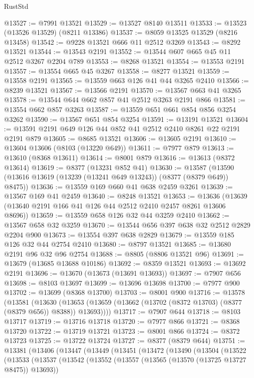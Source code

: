 \begin{lexlean}{RustStd}
\begin{coremodule}
@13527 := @7991 @13521
@13529 := @13527 @8140 @13511
@13533 := @13523 (@13526 @13529) (@8211 @13386)
@13537 := @8059 @13525 @13529 (@8216 @13458)
@13542 := @9228 @13521 @666 @11 @2512 @3269
@13543 := @8292 @13521
@13544 := @13543 @2191
@13552 := @13544 @607 @665 @45 @11 @2512 @3267 @2204 @789
@13553 := @8268 @13521
@13554 := @13553 @2191
@13557 := @13554 @665 @45 @3267
@13558 := @8277 @13521
@13559 := @13558 @2191
@13565 := @13559 @663 @126 @41 @44 @3265 @2410
@13566 := @8239 @13521
@13567 := @13566 @2191
@13570 := @13567 @663 @41 @3265
@13578 := @13544 @644 @662 @857 @41 @2512 @3263 @2191 @866
@13581 := @13554 @662 @857 @3263
@13587 := @13559 @651 @661 @854 @856 @3254 @3262
@13590 := @13567 @651 @854 @3254
@13591 := @13191 @13521
@13604 := @13591 @2191 @649 @126 @44 @852 @41 @2512 @2410 @8261 @22 @2191 @2191 @879
@13605 := @8685 @13521
@13606 := @13605 @2191
@13610 := @13604 @13606 (@8103 (@13220 @649))
@13611 := @7977 @879
@13613 := @13610 (@8368 @13611)
@13614 := @8001 @879
@13616 := @13613 (@8372 @13614)
@13619 := @8377 (@13231 @852 @41)
@13630 := @13587 (@13590 (@13616 @13619 (@13239 (@13241 @649 @13243)) (@8377 (@8379 @649)) @8475))
@13636 := @13559 @169 @660 @41 @638 @2459 @3261
@13639 := @13567 @169 @41 @2459
@13640 := @8248 @13521
@13653 := @13636 (@13639 (@13640 @2191 @166 @41 @126 @44 @2512 @2410 @2457 @8261 @13606 @8696))
@13659 := @13559 @658 @126 @32 @44 @3259 @2410
@13662 := @13567 @658 @32 @3259
@13670 := @13544 @656 @397 @638 @32 @2512 @2829 @2204 @900
@13673 := @13554 @397 @638 @2829
@13679 := @13559 @185 @126 @32 @44 @2754 @2410
@13680 := @8797 @13521
@13685 := @13680 @2191 @96 @32 @96 @2754
@13688 := @8805 (@8806 @13521 @96)
@13691 := @13679 (@13685 @13688 @10186)
@13692 := @8359 @13521
@13693 := @13692 @2191
@13696 := @13670 (@13673 (@13691 @13693))
@13697 := @7907 @656
@13698 := @8103 @13697
@13699 := @13696 @13698
@13700 := @7977 @900
@13702 := @13699 (@8368 @13700)
@13703 := @8001 @900
@13716 := @13578
    (@13581
      (@13630 (@13653 (@13659 (@13662 (@13702 (@8372 @13703) (@8377 (@8379 @656)) @8388)) @13693))))
@13717 := @7907 @644
@13718 := @8103 @13717
@13719 := @13716 @13718
@13720 := @7977 @866
@13721 := @8368 @13720
@13722 := @13719 @13721
@13723 := @8001 @866
@13724 := @8372 @13723
@13725 := @13722 @13724
@13727 := @8377 (@8379 @644)
@13751 := @13381
    (@13406
      (@13447
        (@13449
          (@13451
            (@13472
              (@13490
                (@13504
                  (@13522
                    (@13533
                      (@13537
                        (@13542
                          (@13552
                            (@13557 (@13565 (@13570 (@13725 @13727 @8475)) @13693))

\end{coremodule}
\end{lexlean}
